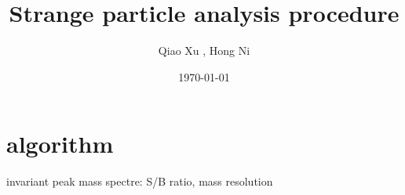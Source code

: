 \documentclass[12pt,a4paper]{article}
\begin{document}
  \title{Strange particle analysis procedure}
  \author{Qiao Xu , Hong Ni}
  \date{\today}
  \maketitle

  \section{algorithm}
	invariant peak mass spectre: S/B ratio, mass resolution
\end{document}
